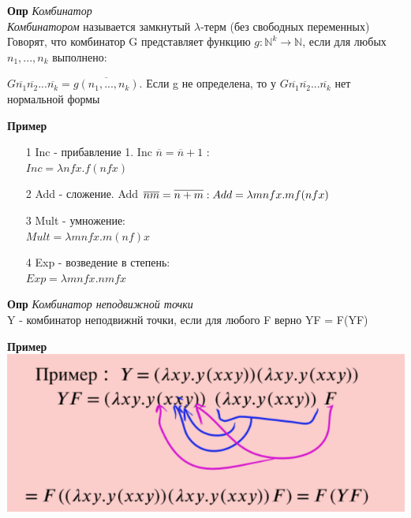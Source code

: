\textbf{Опр} \textit{Комбинатор}\\
\textit{Комбинатором} называется замкнутый $\lambda$-терм (без свободных переменных) \\ Говорят, что комбинатор G представляет функцию $g: \mathbb{N}^k \rightarrow \mathbb{N}$, если для любых $n_1, ..., n_k$ выполнено:
\begin{center}
    $G\overline{n_1}\overline{n_2}...\overline{n_k} = \overline{g(n_1,...,n_k)}$. Если g  не определена, то у $G\overline{n_1}\overline{n_2}...\overline{n_k}$ нет нормальной формы
\end{center}
\textbf{Пример}
\begin{itemize}
    \item [1] Inc - прибавление 1. Inc $\overline{n} = \overline{n} + 1$ : \\
    $Inc = \lambda nfx.f(nfx)$
    \item [2] Add - сложение.  Add $\overline{n} \overline{m} = \overline{n + m}: \\
    Add = \lambda mn fx.mf(nfx)$
    \item[3] Mult - умножение:\\
    $Mult = \lambda mn fx. m(nf)x$
     \item[4] Exp - возведение в степень:\\
    $Exp = \lambda mn fx. nmfx$
\end{itemize}
\textbf{Опр} \textit{Комбинатор неподвижной точки} \\
Y - комбинатор неподвижнй точки, если для любого F верно YF = F(YF)


\textbf{Пример}
\includegraphics{images/3 (определения)_m32.PNG}